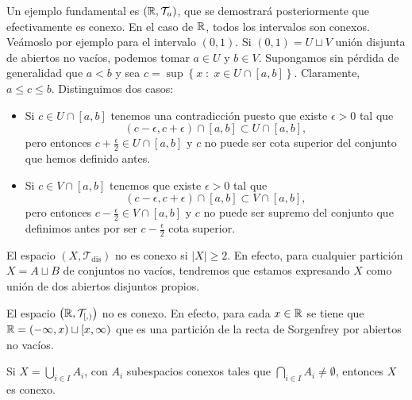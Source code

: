 \begin{eg}
Un ejemplo fundamental es $\displaystyle \left(\mathbb{R}, \mathcal{T}_{u}\right) $, que se demostrará posteriormente que efectivamente es conexo. En el caso de $\displaystyle \mathbb{R} $, todos los intervalos son conexos. Veámoslo por ejemplo para el intervalo $\displaystyle \left(0,1\right) $. Si $\displaystyle \left(0,1\right)=U \sqcup V $ unión disjunta de abiertos no vacíos, podemos tomar $\displaystyle a \in U $ y $\displaystyle b \in V $. 
Supongamos sin pérdida de generalidad que $\displaystyle a < b $ y sea $\displaystyle c = \sup \left\{ x \; : \; x \in U \cap \left[a,b\right] \right\}  $. Claramente, $\displaystyle a \leq c \leq b $. Distinguimos dos casos:
\begin{itemize}
\item Si $\displaystyle c \in U \cap \left[a,b\right]  $ tenemos una contradicción puesto que existe $\displaystyle \epsilon > 0 $ tal que 
\[\left(c-\epsilon , c + \epsilon \right)\cap \left[a,b\right] \subset U \cap \left[a,b\right]  ,\]
pero entonces $\displaystyle c + \frac{\epsilon }{2}\in U \cap \left[a,b\right]  $ y $\displaystyle c  $ no puede ser cota superior del conjunto que hemos definido antes.
\item Si $\displaystyle c \in V \cap \left[a,b\right]  $ tenemos que existe $\displaystyle \epsilon > 0 $ tal que 
	\[\left(c-\epsilon, c + \epsilon \right)\cap \left[a,b\right] \subset V \cap \left[a,b\right]  ,\]
	pero entonces $\displaystyle c - \frac{\epsilon }{2}\in V \cap \left[a,b\right]  $ y $\displaystyle c $ no puede ser supremo del conjunto que definimos antes por ser $\displaystyle c-\frac{\epsilon }{2} $ cota superior.
\end{itemize}
\end{eg}
\begin{eg}
El espacio $\displaystyle \left(X, \mathcal{T}_{\text{dis}}\right) $ no es conexo si $\displaystyle \left|X\right|\geq 2 $. En efecto, para cualquier partición $\displaystyle X = A \sqcup B $ de conjuntos no vacíos, tendremos que estamos expresando $\displaystyle X $ como unión de dos abiertos disjuntos propios.
\end{eg}
\begin{eg}
El espacio $\displaystyle \left(\mathbb{R}, \mathcal{T}_{[,)}\right) $ no es conexo. En efecto, para cada $\displaystyle x \in \mathbb{R} $ se tiene que $\displaystyle \mathbb{R} = \left(-\infty, x\right)\sqcup[x, \infty) $ que es una partición de la recta de Sorgenfrey por abiertos no vacíos.
\end{eg}
\begin{theorem}
Si $\displaystyle X = \bigcup_{i \in I}A_{i} $, con $\displaystyle A_{i} $ subespacios conexos tales que $\displaystyle \bigcap_{i \in I}A_{i}\neq \emptyset  $, entonces $\displaystyle X $ es conexo.
\end{theorem}
